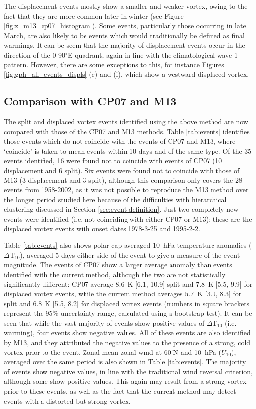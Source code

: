 The displacement events mostly show a smaller and weaker vortex, owing to the
fact that they are more common later in winter (see Figure
\ref{fig:z_m13_cp07_histogram}). Some events, particularly those occurring in
late March, are also likely to be events which would traditionally be defined as
final warmings. It can be seem that the majority of displacement events occur in
the direction of the 0-90$^{\circ}$E quadrant, again in line with the
climatological wave-1 pattern. However, there are some exceptions to this, for
instance Figures \ref{fig:gph_all_events_displs} (c) and (i), which  show a
westward-displaced vortex. 



\subsection{Comparison with CP07 and M13}

The split and displaced vortex events identified using the above method are now
compared with those of the CP07 and M13 methods. Table \ref{tab:events}
identifies those events which do not coincide with the events of CP07 and M13,
where `coincide' is taken to mean events within 10 days and of the same type. Of
the 35 events identified, 16 were found not to coincide with events of CP07 (10
displacement and 6 split). Six events were found not to coincide with those of
M13 (3 displacement and 3 split), although this comparison only covers the 28
events from 1958-2002, as it was not possible to reproduce the M13 method over
the longer period studied here because of the difficulties with hierarchical
clustering discussed in Section \ref{sec:event-definition}. Just two completely
new events were identified (i.e. not coinciding with either CP07 or M13); these
are the displaced vortex events with onset dates 1978-3-25 and 1995-2-2.

Table \ref{tab:events} also shows polar cap averaged 10~hPa temperature
anomalies ($\Delta \mathrm{T}_{10}$), averaged 5 days either side of the event
to give a measure of the event magnitude. The events of CP07 show a larger
average anomaly than events identified with the current method, although the two
are not statistically significantly different: CP07 average 8.6~K [6.1, 10.9]
split and 7.8~K [5.5, 9.9] for displaced vortex events, while the current method
averages 5.7~K [3.0, 8.3] for split and 6.8~K [5.5, 8.2] for displaced vortex
events (numbers in square brackets represent the 95\% uncertainty range,
calculated using a bootstrap test). It can be seen that while the vast majority
of events show positive values of $\Delta \mathrm{T}_{10}$ (i.e. warming), four
events show negative values. All of these events are also identified by M13, and
they attributed the negative values to the presence of a strong, cold vortex
prior to the event. Zonal-mean zonal wind at $60^{\circ}$N and 10~hPa
($\overline{U}_{10}$), averaged over the same period is also shown in Table
\ref{tab:events}. The majority of events show negative values, in line with the
traditional wind reversal criterion, although some show positive values. This
again may result from a strong vortex prior to these events, as well as the fact
that the current method may detect events with a distorted but strong vortex. 

